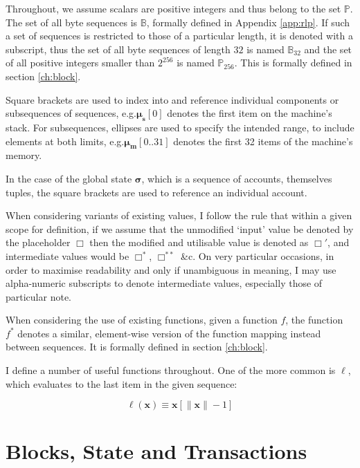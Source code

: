 \documentclass[9pt,oneside]{amsart}
\makeatletter
\newcommand*\eg{e.g.\@\xspace}
\makeatother
\begin{document}
\begin{multicols}{2}
Throughout, we assume scalars are positive integers and thus belong to the set $\mathbb{P}$. The set of all byte sequences is $\mathbb{B}$, formally defined in Appendix \ref{app:rlp}. If such a set of sequences is restricted to those of a particular length, it is denoted with a subscript, thus the set of all byte sequences of length $32$ is named $\mathbb{B}_{32}$ and the set of all positive integers smaller than $2^{256}$ is named $\mathbb{P}_{256}$. This is formally defined in section \ref{ch:block}.

Square brackets are used to index into and reference individual components or subsequences of sequences, \eg $\boldsymbol{\mu}_\mathbf{s}[0]$ denotes the first item on the machine's stack. For subsequences, ellipses are used to specify the intended range, to include elements at both limits, \eg $\boldsymbol{\mu}_\mathbf{m}[0..31]$ denotes the first 32 items of the machine's memory.

In the case of the global state $\boldsymbol{\sigma}$, which is a sequence of accounts, themselves tuples, the square brackets are used to reference an individual account.

When considering variants of existing values, I follow the rule that within a given scope for definition, if we assume that the unmodified `input' value be denoted by the placeholder $\Box$ then the modified and utilisable value is denoted as $\Box'$, and intermediate values would be $\Box^*$,  $\Box^{**}$ \&c. On very particular occasions, in order to maximise readability and only if unambiguous in meaning, I may use alpha-numeric subscripts to denote intermediate values, especially those of particular note.

When considering the use of existing functions, given a function $f$, the function $f^*$ denotes a similar, element-wise version of the function mapping instead between sequences. It is formally defined in section \ref{ch:block}.

I define a number of useful functions throughout. One of the more common is $\ell$, which evaluates to the last item in the given sequence:

\begin{equation}
\ell(\mathbf{x}) \equiv \mathbf{x}[\lVert \mathbf{x} \rVert - 1]
\end{equation}

\section{Blocks, State and Transactions} \label{ch:bst}


\end{multicols}
\end{document}
